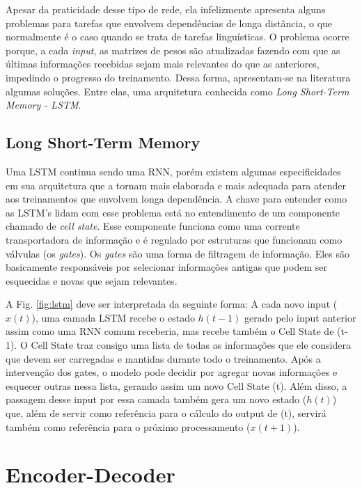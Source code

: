 Apesar da praticidade desse tipo de rede, ela infelizmente apresenta alguns problemas para tarefas que envolvem dependências de longa distância, o que normalmente é o caso quando se trata de tarefas linguísticas. O problema ocorre porque, a cada \textit{input}, as matrizes de pesos são atualizadas fazendo com que as últimas informações recebidas sejam mais relevantes do que as anteriores, impedindo o progresso do treinamento. Dessa forma, apresentam-se na literatura algumas soluções. Entre elas, uma arquitetura conhecida como \textit{Long Short-Term Memory - LSTM}.



\subsection{Long Short-Term Memory}
\label{sec:LSTM}

Uma LSTM continua sendo uma RNN, porém existem algumas especificidades em sua arquitetura que a tornam mais elaborada e mais adequada para atender aos treinamentos que envolvem longa dependência. A chave para entender como as LSTM's lidam com esse problema está no entendimento de um componente chamado de \textit{cell state}. Esse componente funciona como uma corrente transportadora de informação e é regulado por estruturas que funcionam como válvulas (os \textit{gates}). Os \textit{gates} são uma forma de filtragem de informação. Eles são basicamente responsáveis por selecionar informações antigas que podem ser esquecidas e novas que sejam relevantes. 



A Fig. \ref{fig:lstm} deve ser interpretada da seguinte forma: A cada novo input ($x(t)$), uma camada LSTM recebe o estado $h(t-1)$ gerado pelo input anterior assim como uma RNN comum receberia, mas recebe também o Cell State de (t-1). O Cell State traz consigo uma lista de todas as informações que ele considera que devem ser carregadas e mantidas durante todo o treinamento. Após a intervenção dos gates, o modelo pode decidir por agregar novas informações e esquecer outras nessa lista, gerando assim um novo Cell State (t). Além disso, a passagem desse input por essa camada também gera um novo estado ($h(t)$) que, além de servir como referência para o cálculo do output de (t), servirá também como referência para o próximo processamento ($x(t+1)$). %

\section{Encoder-Decoder}
\label{sec:enc-dec}

